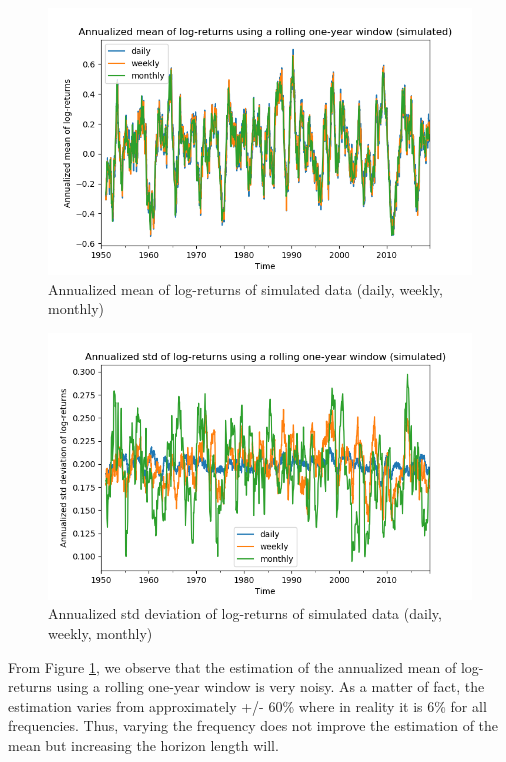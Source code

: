 \documentclass[10pt]{article}
\newenvironment{exercise}[2][Exercise]{\begin{trivlist}
  \item[\hskip \labelsep {\bfseries #1}\hskip \labelsep {\bfseries #2.}]}{\end{trivlist}}
\begin{document}
\begin{exercise}{3}
\begin{figure}[H]
		\centering
		\includegraphics[scale=0.5]{Figures/problem3d_mean.png}	
		\caption{Annualized mean of log-returns of simulated data (daily, weekly, monthly)}	
		\label{fig:problem3d_mean}
	
	\end{figure}
	
	\begin{figure}[H]
	
		\centering
		\includegraphics[scale=0.5]{Figures/problem3d_std.png}	
		\caption{Annualized std deviation of log-returns of simulated data (daily, weekly, monthly)}	
		\label{fig:problem3d_std}
	
	\end{figure}
	
	From Figure \ref{fig:problem3d_mean}, we observe that the estimation of the annualized mean of log-returns using a rolling one-year window is very noisy. As a matter of fact, the estimation varies from approximately +/- 60\% where in reality it is 6\% for all frequencies. Thus, varying the frequency does not improve the estimation of the mean but increasing the horizon length  will. 
	

\end{exercise}
\end{document}
